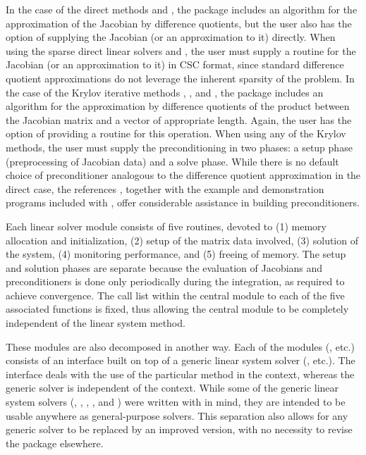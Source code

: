 In the case of the direct methods {\idadense} and {\idaband}, the
package includes an algorithm for the approximation of the Jacobian by
difference quotients, but the user also has the option of supplying
the Jacobian (or an approximation to it) directly.
When using the sparse direct linear solvers {\cvklu} and
{\cvsuperlumt}, the user must supply a routine for the Jacobian (or an
approximation to it) in CSC format, since standard difference quotient
approximations do not leverage the inherent sparsity of the problem.
In the case of the Krylov iterative methods {\idaspgmr}, {\idaspbcg},
and {\idasptfqmr}, the package includes an algorithm for the
approximation by difference quotients of the product between the
Jacobian matrix and a vector of appropriate length. Again, the user
has the option of providing a routine for this operation.
When  using any of the Krylov
methods, the user must supply the preconditioning in two phases: 
a setup phase (preprocessing of Jacobian data) and a solve phase.
While there is no default
choice of preconditioner analogous to the difference quotient
approximation in the direct case, the references
\cite{BrHi:89, Byr:92}, together with
the example and demonstration programs included with {\ida}, offer
considerable assistance in building preconditioners.

Each {\ida} linear solver module consists of five routines, devoted to
(1) memory allocation and initialization, (2) setup of the matrix data
involved, (3) solution of the system, (4) monitoring performance,
and (5) freeing of memory.  
The setup and solution phases are separate because the evaluation of
Jacobians and preconditioners is done only periodically during the
integration, as required to achieve convergence. The call list within
the central {\ida} module to each of the five associated functions is
fixed, thus allowing the central module to be completely independent
of the linear system method.

These modules are also decomposed in another way.
Each of the modules ({\idadense}, etc.) consists of an interface built
on top of a generic linear system solver ({\dense}, etc.).  The
interface deals with the use of the particular method in the {\ida}
context, whereas the generic solver is independent of the context.
While some of the generic linear system solvers ({\dense}, {\band},
{\spgmr}, {\spbcg}, and {\sptfqmr}) were written with {\sundials} in
mind, they are intended to be usable anywhere as general-purpose
solvers.  This separation also allows for any generic solver to be
replaced by an improved version, with no necessity to revise the
{\ida} package elsewhere.

